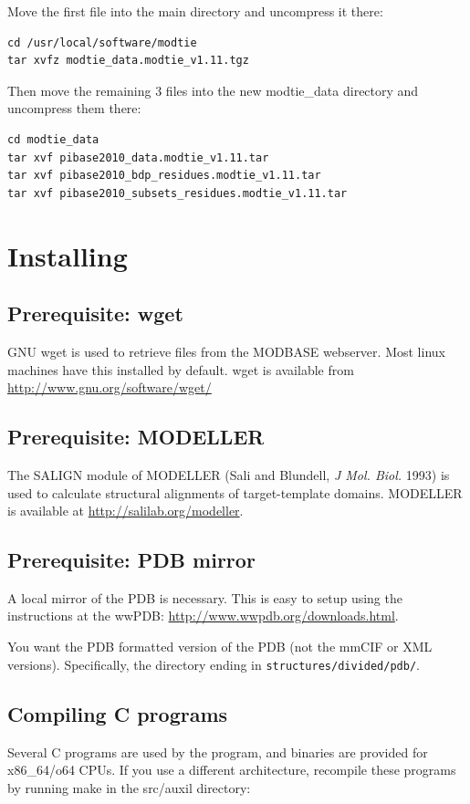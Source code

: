 \documentclass[11pt]{article}
\begin{document}
Move the first file into the main directory and uncompress it there:
\lstset{breaklines=true,language=bash,breakatwhitespace=true}
\lstset{frame=single}
\lstset{basicstyle=\ttfamily}
\begin{lstlisting}
cd /usr/local/software/modtie
tar xvfz modtie_data.modtie_v1.11.tgz
\end{lstlisting}

Then move the remaining 3 files into the new modtie\_data directory and uncompress them there:
\lstset{breaklines=true,language=bash,breakatwhitespace=true}
\lstset{frame=single}
\lstset{basicstyle=\ttfamily}
\begin{lstlisting}
cd modtie_data
tar xvf pibase2010_data.modtie_v1.11.tar
tar xvf pibase2010_bdp_residues.modtie_v1.11.tar
tar xvf pibase2010_subsets_residues.modtie_v1.11.tar
\end{lstlisting}

\section{Installing}

\subsection{Prerequisite: wget}
GNU wget is used to retrieve files from the MODBASE webserver. Most linux machines have this installed by default. wget is available from \url{http://www.gnu.org/software/wget/}

\subsection{Prerequisite: MODELLER}
The SALIGN module of MODELLER (Sali and Blundell, {\it J Mol. Biol.} 1993) is used to calculate structural alignments of target-template domains. MODELLER is available at \url{http://salilab.org/modeller}.

\subsection{Prerequisite: PDB mirror}
A local mirror of the PDB is necessary. This is easy to setup using the instructions at the wwPDB: \url{http://www.wwpdb.org/downloads.html}.

You want the PDB formatted version of the PDB (not the mmCIF or XML versions). Specifically, the directory ending in {\tt structures/divided/pdb/}.

\subsection{Compiling C programs}
Several C programs are used by the program, and binaries are provided for x86\_64/o64 CPUs. If you use a different architecture, recompile these programs by running make in the src/auxil directory:
\end{document}
